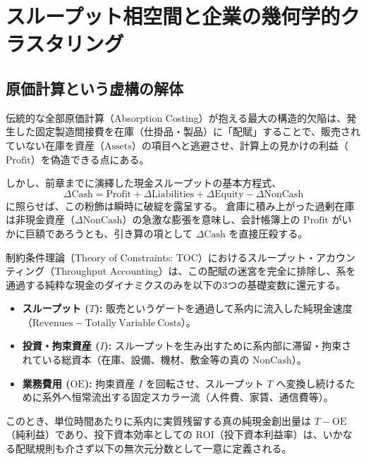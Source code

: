 \chapter{スループット相空間と企業の幾何学的クラスタリング}
\label{chap:throughput_phase_space}

\section{原価計算という虚構の解体}

伝統的な全部原価計算（Absorption Costing）が抱える最大の構造的欠陥は、発生した固定製造間接費を在庫（仕掛品・製品）に「配賦」することで、販売されていない在庫を資産（\(\mathrm{Assets}\)）の項目へと逃避させ、計算上の見かけの利益（\(\mathrm{Profit}\)）を偽造できる点にある。

しかし、前章までに演繹した現金スループットの基本方程式、
\begin{equation}
    \Delta \mathrm{Cash} = \mathrm{Profit} + \Delta \mathrm{Liabilities} + \Delta \mathrm{Equity} - \Delta \mathrm{NonCash}
\end{equation}
に照らせば、この粉飾は瞬時に破綻を露呈する。
倉庫に積み上がった過剰在庫は非現金資産（\(\Delta \mathrm{NonCash}\)）の急激な膨張を意味し、会計帳簿上の \(\mathrm{Profit}\) がいかに巨額であろうとも、引き算の項として \(\Delta \mathrm{Cash}\) を直接圧殺する。

制約条件理論（Theory of Constraints: TOC）におけるスループット・アカウンティング（Throughput Accounting）は、この配賦の迷宮を完全に排除し、系を通過する純粋な現金のダイナミクスのみを以下の3つの基礎変数に還元する。

\begin{itemize}
    \item \textbf{スループット (\(T\)):} 販売というゲートを通過して系内に流入した純現金速度（\(\mathrm{Revenues} - \mathrm{Totally\ Variable\ Costs}\)）。
    \item \textbf{投資・拘束資産 (\(I\)):} スループットを生み出すために系内部に滞留・拘束されている総資本（在庫、設備、機材、敷金等の真の \(\mathrm{NonCash}\)）。
    \item \textbf{業務費用 (\(\mathrm{OE}\)):} 拘束資産 \(I\) を回転させ、スループット \(T\) へ変換し続けるために系外へ恒常流出する固定スカラー流（人件費、家賃、通信費等）。
\end{itemize}

このとき、単位時間あたりに系内に実質残留する真の純現金創出量は \(T - \mathrm{OE}\)（純利益）であり、投下資本効率としての \(\mathrm{ROI}\)（投下資本利益率）は、いかなる配賦規則も介さず以下の無次元分数として一意に定義される。

